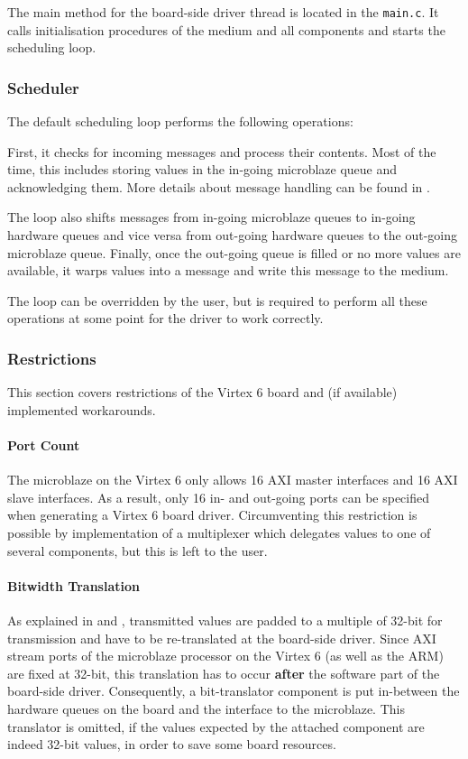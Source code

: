 \documentclass{report}
\begin{document}
The main method for the board-side driver thread is located in the \texttt{main.c}. It calls initialisation procedures of the medium and all components and starts the scheduling loop.

\subsubsection{Scheduler}
The default scheduling loop performs the following operations:

First, it checks for incoming messages and process their contents. Most of the time, this includes storing values in the in-going microblaze queue and acknowledging them. More details about message handling can be found in .

The loop also shifts messages from in-going microblaze queues to in-going hardware queues and vice versa from out-going hardware queues to the out-going microblaze queue. Finally, once the out-going queue is filled or no more values are available, it warps values into a message and write this message to the medium. 

The loop can be overridden by the user, but is required to perform all these operations at some point for the driver to work correctly.

\subsubsection{Restrictions}
This section covers restrictions of the Virtex 6 board and (if available) implemented workarounds.

\paragraph{Port Count}
The microblaze on the Virtex 6 only allows 16 AXI master interfaces and 16 AXI slave interfaces. As a result, only 16 in- and out-going ports can be specified when generating a Virtex 6 board driver. Circumventing this restriction is possible by implementation of a multiplexer which delegates values to one of several components, but this is left to the user.

\paragraph{Bitwidth Translation}
As explained in  and , transmitted values are padded to a multiple of 32-bit for transmission and have to be re-translated at the board-side driver.
Since AXI stream ports of the microblaze processor on the Virtex 6 (as well as the ARM) are fixed at 32-bit, this translation has to occur \textbf{after} the software part of the board-side driver. Consequently, a bit-translator component is put in-between the hardware queues on the board and the interface to the microblaze. This translator is omitted, if the values expected by the attached component are indeed 32-bit values, in order to save some board resources.
\end{document}
